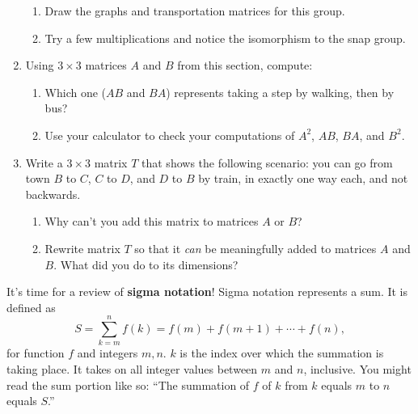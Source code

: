 \documentclass[../textbook.tex]{subfiles}
\begin{document}
\begin{enumerate}
\begin{enumerate}
\item Draw the graphs and transportation matrices for this group.
\item Try a few multiplications and notice the isomorphism to the snap group.
\end{enumerate}
\item Using $3\times 3$ matrices $A$ and $B$ from this section, compute:
\begin{enumerate}
\end{enumerate}
\begin{enumerate}
\setcounter{enumii}{\value{problem_ii}}
\item Which one ($AB$ and $BA$) represents taking a step by walking, then by bus?
\item Use your calculator to check your computations of $A^2$, $AB$, $BA$, and $B^2$.
\end{enumerate}
\item Write a $3\times 3$ matrix $T$ that shows the following scenario: you can go from town $B$ to $C$, $C$ to $D$, and $D$ to $B$ by train, in exactly one way each, and not backwards.
\begin{enumerate}
\item Why can't you add this matrix to matrices $A$ or $B$?
\item Rewrite matrix $T$ so that it \textit{can} be meaningfully added to matrices $A$ and $B$. What did you do to its dimensions?
\end{enumerate}
\setcounter{problem_i}{\value{enumi}}
\end{enumerate}

\noindent It's time for a review of \textbf{sigma notation}! Sigma notation represents a sum. It is defined as
$$S=\sum_{k=m}^{n} f(k)=f(m)+f(m+1)+\cdots + f(n),$$
for function $f$ and integers $m,n$. $k$ is the index over which the summation is taking place. It takes on all integer values between $m$ and $n$, inclusive. You might read the sum portion like so: ``The summation of $f$ of $k$ from $k$ equals $m$ to $n$ equals $S$.''
\end{document}
